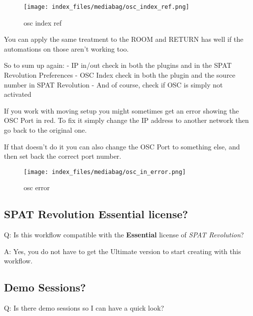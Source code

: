 \documentclass[
  letterpaper,
  DIV=11,
  numbers=noendperiod]{scrreport}
\begin{document}
\begin{figure}

{\centering \texttt{[image: index\_files/mediabag/osc\_index\_ref.png]}

}

\caption{osc index ref}

\end{figure}

You can apply the same treatment to the ROOM and RETURN has well if the
automations on those aren't working too.

So to sum up again: - IP in/out check in both the plugins and in the
SPAT Revolution Preferences - OSC Index check in both the plugin and the
source number in SPAT Revolution - And of course, check if OSC is simply
not activated

If you work with moving setup you might sometimes get an error showing
the OSC Port in red. To fix it simply change the IP address to another
network then go back to the original one.

If that doesn't do it you can also change the OSC Port to something
else, and then set back the correct port number.

\begin{figure}

{\centering \texttt{[image: index\_files/mediabag/osc\_in\_error.png]}

}

\caption{osc error}

\end{figure}

\hypertarget{spat-revolution-essential-license}{%
\subsection{SPAT Revolution Essential
license?}\label{spat-revolution-essential-license}}

Q: Is this workflow compatible with the \textbf{Essential} license of
\emph{SPAT Revolution}?

A: Yes, you do not have to get the Ultimate version to start creating
with this workflow.

\hypertarget{demo-sessions}{%
\subsection{Demo Sessions?}\label{demo-sessions}}

Q: Is there demo sessions so I can have a quick look?
\end{document}
